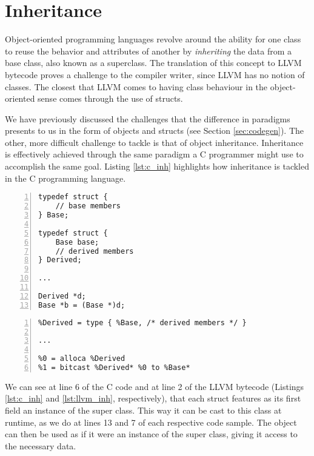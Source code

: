 \section{Inheritance}
\label{sec:inheritance}

Object-oriented programming languages revolve around the ability for one class to reuse the behavior and attributes of another by \textit{inheriting} the data from a base class, also known as a superclass. The translation of this concept to LLVM bytecode proves a challenge to the compiler writer, since LLVM has no notion of classes. The closest that LLVM comes to having class behaviour  in the object-oriented sense comes through the use of structs.

We have previously discussed the challenges that the difference in paradigms presents to us in the form of objects and structs (see Section \ref{sec:codegen}). The other, more difficult challenge to tackle is that of object inheritance. Inheritance is effectively achieved through the same paradigm a C programmer might use to accomplish the same goal. Listing \ref{lst:c_inh} highlights how inheritance is tackled in the C programming language.

\lstset{
	language=C,
	basicstyle=\small,
	stringstyle=\ttfamily
}

\begin{lstlisting}[frame=single, numbers=left, numberstyle=\tiny, caption={C Inheritance}, label=lst:c_inh]
typedef struct {
    // base members
} Base;

typedef struct {
    Base base;  
    // derived members   
} Derived;

...

Derived *d;
Base *b = (Base *)d;
\end{lstlisting}

\newpage

\begin{lstlisting}[frame=single, numbers=left, numberstyle=\tiny, caption={LLVM IR Inheritance}, label=lst:llvm_inh]
%Base = type { /* base members */ }
%Derived = type { %Base, /* derived members */ }

...

%0 = alloca %Derived
%1 = bitcast %Derived* %0 to %Base*
\end{lstlisting}

We can see at line 6 of the C code and at line 2 of the LLVM bytecode (Listings \ref{lst:c_inh} and \ref{lst:llvm_inh}, respectively), that each struct features as its first field an instance of the super class. This way it can be cast to this class at runtime, as we do at lines 13 and 7 of each respective code sample. The object can then be used as if it were an instance of the super class, giving it access to the necessary data.
